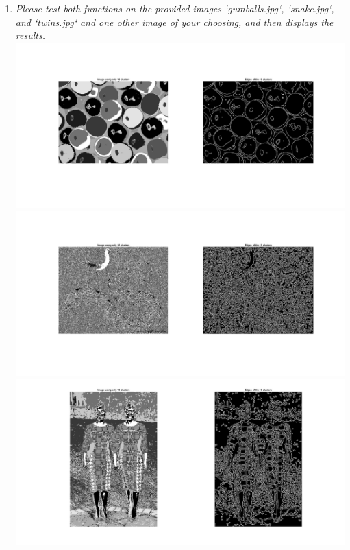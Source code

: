 \documentclass[11pt]{article}
\begin{document}
\begin{enumerate}
        \item \textit{Please test both functions on the provided images ‘gumballs.jpg‘, ‘snake.jpg‘, and ‘twins.jpg‘
        and one other image of your choosing, and then displays the results.}\newline
        \includegraphics[width=\textwidth]{Output Pictures/gumball_kmeans}\newline
        \includegraphics[width=\textwidth]{Output Pictures/snake_kmeans}\newline
        \includegraphics[width=\textwidth]{Output Pictures/twins_kmeans}\newline

    \end{enumerate}
\end{document}
